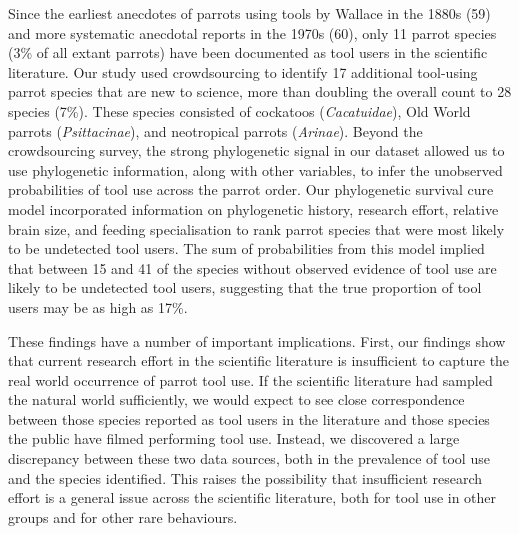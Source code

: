 \documentclass[
  man,floatsintext]{apa6}
\begin{document}
Since the earliest anecdotes of parrots using tools by Wallace in the 1880s
(59) and more systematic anecdotal reports in the 1970s (60),
only 11 parrot species (3\% of all extant parrots) have been documented as tool
users in the scientific literature. Our study used crowdsourcing to identify 17
additional tool-using parrot species that are new to science, more than doubling
the overall count to 28 species (7\%). These species consisted of cockatoos
(\emph{Cacatuidae}), Old World parrots (\emph{Psittacinae}), and neotropical parrots
(\emph{Arinae}). Beyond the crowdsourcing survey, the strong phylogenetic signal in
our dataset allowed us to use phylogenetic information, along with other
variables, to infer the unobserved probabilities of tool use across the parrot
order. Our phylogenetic survival cure model incorporated information on
phylogenetic history, research effort, relative brain size, and feeding
specialisation to rank parrot species that were most likely to be undetected
tool users. The sum of probabilities from this model implied that between 15
and 41 of the species without observed evidence of tool use are likely to be
undetected tool users, suggesting that the true proportion of tool users may be
as high as 17\%.

These findings have a number of important implications. First, our findings show
that current research effort in the scientific literature is insufficient to
capture the real world occurrence of parrot tool use. If the scientific
literature had sampled the natural world sufficiently, we would expect to see
close correspondence between those species reported as tool users in the
literature and those species the public have filmed performing tool use.
Instead, we discovered a large discrepancy between these two data sources, both
in the prevalence of tool use and the species identified. This raises the
possibility that insufficient research effort is a general issue across the
scientific literature, both for tool use in other groups and for other rare
behaviours.
\end{document}

